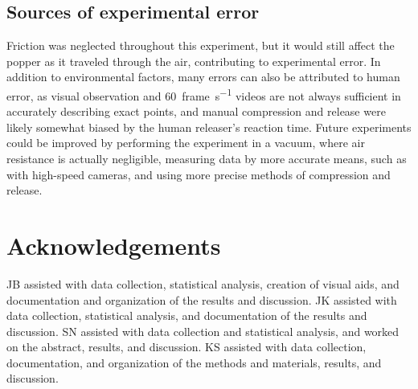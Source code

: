 \documentclass[reprint,amsmath,amssymb,aps,twoside]{revtex4-2} %
\begin{document}
\subsection{Sources of experimental error}
Friction was neglected throughout this experiment, but it would still affect the popper as it traveled through the air, contributing to experimental error. In addition to environmental factors, many errors can also be attributed to human error, as visual observation and \qty{60}{frame\per\second} videos are not always sufficient in accurately describing exact points, and manual compression and release were likely somewhat biased by the human releaser’s reaction time. Future experiments could be improved by performing the experiment in a vacuum, where air resistance is actually negligible, measuring data by more accurate means, such as with high-speed cameras, and using more precise methods of compression and release.


    





    
\section{Acknowledgements}
JB assisted with data collection, statistical analysis, creation of visual aids, and documentation and organization of the results and discussion. JK assisted with data collection, statistical analysis, and documentation of the results and discussion. SN assisted with data collection and statistical analysis, and worked on the abstract, results, and discussion. KS assisted with data collection, documentation, and organization of the methods and materials, results, and discussion.






\end{document}
